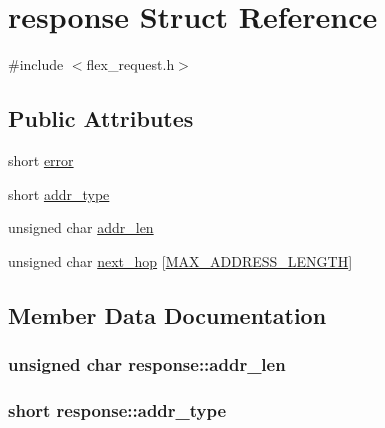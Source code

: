 \hypertarget{structresponse}{}\section{response Struct Reference}
\label{structresponse}


{\ttfamily \#include $<$flex\+\_\+request.\+h$>$}

\subsection*{Public Attributes}
\begin{DoxyCompactItemize}
\item 
short \hyperlink{structresponse_ae098504ec8fd2c1eafd3b8487a783575}{error}
\item 
short \hyperlink{structresponse_a2f45198ba85a80efc09cbde6098af0b8}{addr\+\_\+type}
\item 
unsigned char \hyperlink{structresponse_a835f830c6f09ed6b0e702b3021f66a57}{addr\+\_\+len}
\item 
unsigned char \hyperlink{structresponse_a6b7eac313932e975cd88a0d998867bb3}{next\+\_\+hop} \mbox{[}\hyperlink{flex__addr_8h_a13b71bf0266170fc990217b80b27f40d}{M\+A\+X\+\_\+\+A\+D\+D\+R\+E\+S\+S\+\_\+\+L\+E\+N\+G\+TH}\mbox{]}
\end{DoxyCompactItemize}


\subsection{Member Data Documentation}
\subsubsection[{\texorpdfstring{addr\+\_\+len}{addr_len}}]{\setlength{\rightskip}{0pt plus 5cm}unsigned char response\+::addr\+\_\+len}\hypertarget{structresponse_a835f830c6f09ed6b0e702b3021f66a57}{}\label{structresponse_a835f830c6f09ed6b0e702b3021f66a57}
\subsubsection[{\texorpdfstring{addr\+\_\+type}{addr_type}}]{\setlength{\rightskip}{0pt plus 5cm}short response\+::addr\+\_\+type}\hypertarget{structresponse_a2f45198ba85a80efc09cbde6098af0b8}{}\label{structresponse_a2f45198ba85a80efc09cbde6098af0b8}
